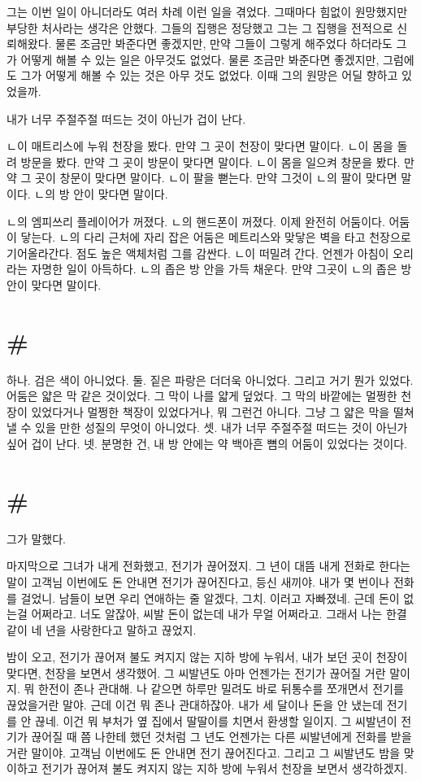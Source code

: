 \documentclass[a5paper,10pt, twoside, openright]{memoir}
\begin{document}
	그는 이번 일이 아니더라도 여러 차례 이런 일을 겪었다. 그때마다 힘없이 원망했지만 부당한 처사라는 생각은 안했다. 그들의 집행은 정당했고 그는 그 집행을 전적으로 신뢰해왔다. 물론 조금만 봐준다면 좋겠지만, 만약 그들이 그렇게 해주었다 하더라도 그가 어떻게 해볼 수 있는 일은 아무것도 없었다. 물론 조금만 봐준다면 좋겠지만, 그럼에도 그가 어떻게 해볼 수 있는 것은 아무 것도 없었다. 이때 그의 원망은 어딜 향하고 있었을까.

	내가 너무 주절주절 떠드는 것이 아닌가 겁이 난다.

	ㄴ이 매트리스에 누워 천장을 봤다. 만약 그 곳이 천장이 맞다면 말이다. ㄴ이 몸을 돌려 방문을 봤다. 만약 그 곳이 방문이 맞다면 말이다. ㄴ이 몸을 일으켜 창문을 봤다. 만약 그 곳이 창문이 맞다면 말이다. ㄴ이 팔을 뻗는다. 만약 그것이 ㄴ의 팔이 맞다면 말이다. ㄴ의 방 안이 맞다면 말이다. 

	ㄴ의 엠피쓰리 플레이어가 꺼졌다. ㄴ의 핸드폰이 꺼졌다. 이제 완전히 어둠이다. 어둠이 닿는다. ㄴ의 다리 근처에 자리 잡은 어둠은 메트리스와 맞닿은 벽을 타고 천장으로 기어올라간다. 점도 높은 액체처럼 그를 감싼다. ㄴ이 떠밀려 간다. 언젠가 아침이 오리라는 자명한 일이 아득하다. ㄴ의 좁은 방 안을 가득 채운다. 만약 그곳이 ㄴ의 좁은 방 안이 맞다면 말이다.

	\section{\#}
	하나. 검은 색이 아니었다. 둘. 짙은 파랑은 더더욱 아니었다. 그리고 거기 뭔가 있었다. 어둠은 얇은 막 같은 것이었다. 그 막이 나를 얇게 덮었다. 그 막의 바깥에는 멀쩡한 천장이 있었다거나 멀쩡한 책장이 있었다거나, 뭐 그런건 아니다. 그냥 그 얇은 막을 떨쳐낼 수 있을 만한 성질의 무엇이 아니었다. 셋. 내가 너무 주절주절 떠드는 것이 아닌가 싶어 겁이 난다. 넷. 분명한 건, 내 방 안에는 약 백아흔 뼘의 어둠이 있었다는 것이다. 

	\section{\#}
	그가 말했다. 
	
	마지막으로 그녀가 내게 전화했고, 전기가 끊어졌지. 그 년이 대뜸 내게 전화로 한다는 말이 고객님 이번에도 돈 안내면 전기가 끊어진다고, 등신 새끼야. 내가 몇 번이나 전화를 걸었니. 남들이 보면 우리 연애하는 줄 알겠다, 그치. 이러고 자빠졌네. 근데 돈이 없는걸 어쩌라고. 너도 알잖아, 씨발 돈이 없는데 내가 무얼 어쩌라고. 그래서 나는 한결같이 네 년을 사랑한다고 말하고 끊었지.

	밤이 오고, 전기가 끊어져 불도 켜지지 않는 지하 방에 누워서, 내가 보던 곳이 천장이 맞다면, 천장을 보면서 생각했어. 그 씨발년도 아마 언젠가는 전기가 끊어질 거란 말이지. 뭐 한전이 존나 관대해. 나 같으면 하루만 밀려도 바로 뒤통수를 쪼개면서 전기를 끊었을거란 말야. 근데 이건 뭐 존나 관대하잖아. 내가 세 달이나 돈을 안 냈는데 전기를 안 끊네. 이건 뭐 부처가 옆 집에서 딸딸이를 치면서 환생할 일이지. 그 씨발년이 전기가 끊어질 때 쯤 나한테 했던 것처럼 그 년도 언젠가는 다른 씨발년에게 전화를 받을거란 말이야. 고객님 이번에도 돈 안내면 전기 끊어진다고. 그리고 그 씨발년도 밤을 맞이하고 전기가 끊어져 불도 켜지지 않는 지하 방에 누워서 천장을 보면서 생각하겠지.
\end{document}
